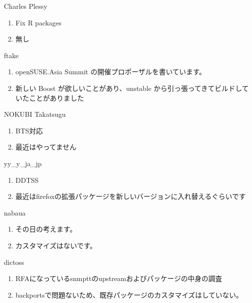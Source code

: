 \begin{prework}{ Charles Plessy }
  \begin{enumerate}
  \item Fix R packages
  \item 無し
  \end{enumerate}
\end{prework}

\begin{prework}{ ftake }
  \begin{enumerate}
  \item openSUSE.Asia Summit の開催プロポーザルを書いています。
  \item 新しい Boost が欲しいことがあり、unstable から引っ張ってきてビルドしていたことがありました
  \end{enumerate}
\end{prework}

\begin{prework}{ NOKUBI Takatsugu }
  \begin{enumerate}
  \item BTS対応
  \item 最近はやってません
  \end{enumerate}
\end{prework}

\begin{prework}{ yy\_y\_ja\_jp }
  \begin{enumerate}
  \item DDTSS
  \item 最近はfirefoxの拡張パッケージを新しいバージョンに入れ替えるぐらいです
  \end{enumerate}
\end{prework}

\begin{prework}{ nabaua }
  \begin{enumerate}
  \item その日の考えます。
  \item カスタマイズはないです。
  \end{enumerate}
\end{prework}

\begin{prework}{ dictoss }
  \begin{enumerate}
  \item RFAになっているsnmpttのupstreamおよびパッケージの中身の調査
  \item backportsで問題ないため、既存パッケージのカスタマイズはしていない。
  \end{enumerate}
\end{prework}

